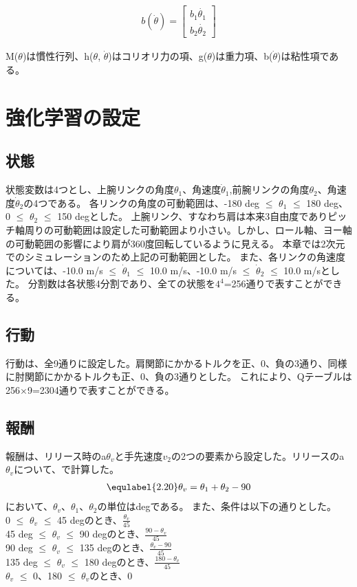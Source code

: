 \begin{eqnarray}
  b(\dot{\theta})=
            \begin{bmatrix}
              b_{1}\dot{\theta_{1}} \\
              b_{2}\dot{\theta_{2}}
            \end{bmatrix}
\end{eqnarray}

M($\theta$)は慣性行列、h($\theta$, $\dot{\theta}$)はコリオリ力の項、g($\theta$)は重力項、b($\dot{\theta}$)は粘性項である。

\section{強化学習の設定}
\subsection{状態}
状態変数は4つとし、上腕リンクの角度$\theta_{1}$、角速度$\dot{\theta}_{1}$,前腕リンクの角度$\theta_{2}$、角速度$\dot{\theta}_{2}$の4つである。
各リンクの角度の可動範囲は、-180 deg $\le$ $\theta_{1}$ $\le$ 180 deg、0 $\le$ $\theta_{2}$ $\le$ 150 degとした。
上腕リンク、すなわち肩は本来3自由度でありピッチ軸周りの可動範囲は設定した可動範囲より小さい。しかし、ロール軸、ヨー軸の可動範囲の影響により肩が360度回転しているように見える。
本章では2次元でのシミュレーションのため上記の可動範囲とした。
また、各リンクの角速度については、-10.0 m/s $\le$ $\dot{\theta}_{1}$ $\le$ 10.0 m/s、-10.0 m/s $\le$ $\dot{\theta}_{2}$ $\le$ 10.0 m/sとした。
分割数は各状態4分割であり、全ての状態を$4^{4}$=256通りで表すことができる。
\subsection{行動}
行動は、全9通りに設定した。肩関節にかかるトルクを正、0、負の3通り、同様に肘関節にかかるトルクも正、0、負の3通りとした。
これにより、Qテーブルは256$\times$9=2304通りで表すことができる。
\subsection{報酬}
報酬は、リリース時のa$\theta_{v}$と手先速度$v_{2}$の2つの要素から設定した。リリースのa$\theta_{v}$について、で計算した。
\begin{eqnarray}
  \equlabel{2.20}
  \theta_{v}=\theta_{1}+\theta_{2}-90
\end{eqnarray}
において、$\theta_{v}$、$\theta_{1}$、$\theta_{2}$の単位はdegである。
また、条件は以下の通りとした。\\
0 $\le$ $\theta_{v}$ $\le$ 45 degのとき、$\frac{\theta_{v}}{45}$\\
45 deg $\le$ $\theta_{v}$ $\le$ 90 degのとき、$\frac{90-\theta_{v}}{45}$\\
90 deg $\le$ $\theta_{v}$ $\le$ 135 degのとき、$\frac{\theta_{v}-90}{45}$\\
135 deg $\le$ $\theta_{v}$ $\le$ 180 degのとき、$\frac{180-\theta_{v}}{45}$\\
$\theta_{v}$ $\le$ 0、180 $\le$ $\theta_{v}$のとき、0\\

